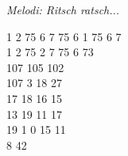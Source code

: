 {\footnotesize\textit{Melodi: Ritsch ratsch...}}\par
\vspace{10pt}
1 2 75 6 7 75 6 1 75 6 7\\
1 2 75 2 7 75 6 73\\
107 105 102\\
107 3 18 27\\
17 18 16 15\\
13 19 11 17\\
19 1 0 15 11\\
8 42
